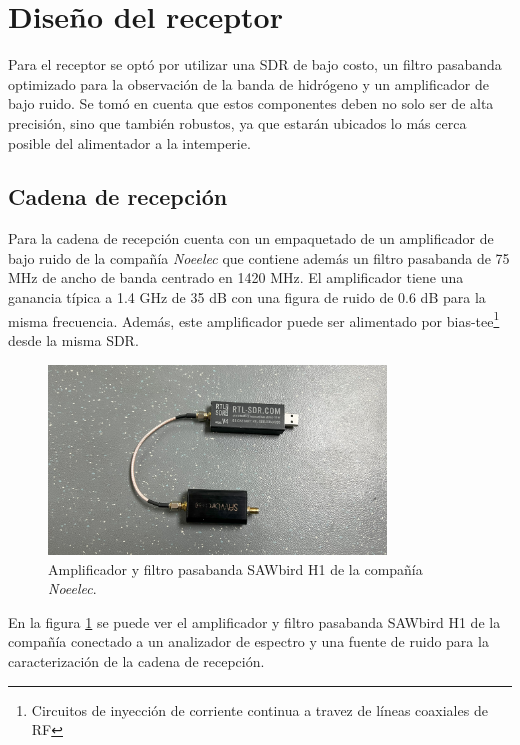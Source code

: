 \section{Diseño del receptor}

Para el receptor se optó por utilizar una SDR de bajo costo, un filtro pasabanda optimizado para la observación de la banda de hidrógeno y un amplificador de bajo ruido. Se tomó en cuenta que estos componentes deben no solo ser de alta precisión, sino que también robustos, ya que estarán ubicados lo más cerca posible del alimentador a la intemperie.\\

\subsection{Cadena de recepción}

Para la cadena de recepción cuenta con un empaquetado de un amplificador de bajo ruido de la compañía \textit{Noeelec} que contiene además un filtro pasabanda de 75 MHz de ancho de banda centrado en 1420 MHz. El amplificador tiene una ganancia típica a 1.4 GHz de 35 dB con una figura de ruido de 0.6 dB para la misma frecuencia. Además, este amplificador puede ser alimentado por bias-tee\footnote{Circuitos de inyección de corriente continua a travez de líneas coaxiales de RF} desde la misma SDR.\\

\begin{figure}
    \centering
    \includegraphics[width=0.8\textwidth]{img/rtl_saw}
    \caption{Amplificador y filtro pasabanda SAWbird H1 de la compañía \textit{Noeelec}.}
    \label{fig:cadena}
\end{figure}

En la figura \ref{fig:cadena} se puede ver el amplificador y filtro pasabanda SAWbird H1 de la compañía conectado a un analizador de espectro y una fuente de ruido para la caracterización de la cadena de recepción.\\

